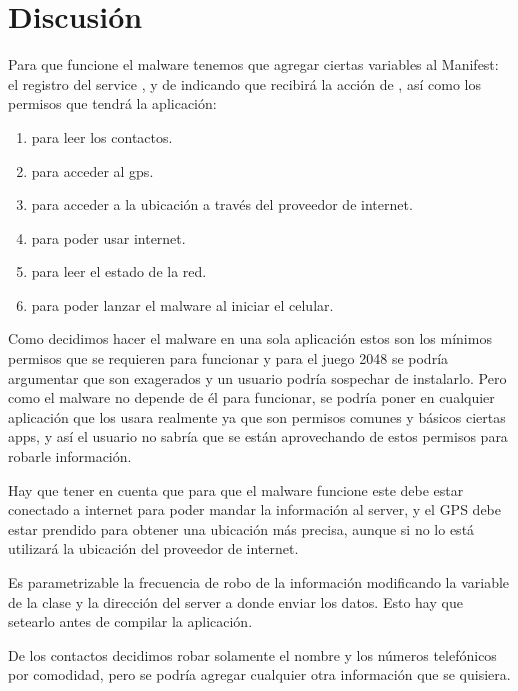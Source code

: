 \section{Discusi\'on}

Para que funcione el malware tenemos que agregar ciertas variables al Manifest: el registro del service , y de  indicando que recibir\'a la acci\'on de , as\'i como los permisos que tendr\'a la aplicaci\'on: 

\begin{enumerate}[nolistsep]
 \item {} para leer los contactos.
 \item {} para acceder al gps.
 \item {} para acceder a la ubicaci\'on a trav\'es del proveedor de internet.
 \item {} para poder usar internet.
 \item {} para leer el estado de la red.
 \item {} para poder lanzar el malware al iniciar el celular. 
\end{enumerate}

Como decidimos hacer el malware en una sola aplicaci\'on estos son los m\'inimos permisos que se requieren para funcionar y para el juego 2048 se podr\'ia argumentar que son exagerados y un usuario podr\'ia sospechar de instalarlo. Pero como el malware no depende de \'el para funcionar, se podr\'ia poner en cualquier aplicaci\'on que los usara realmente ya que son permisos comunes y b\'asicos ciertas apps, y as\'i el usuario no sabr\'ia que se est\'an aprovechando de estos permisos para robarle informaci\'on. 

Hay que tener en cuenta que para que el malware funcione este debe estar conectado a internet para poder mandar la informaci\'on al server, y el GPS debe estar prendido para obtener una ubicaci\'on m\'as precisa, aunque si no lo est\'a utilizar\'a la ubicaci\'on del proveedor de internet. 

Es parametrizable la frecuencia de robo de la informaci\'on modificando la variable  de la clase  y la direcci\'on del server a donde enviar los datos. Esto hay que setearlo antes de compilar la aplicaci\'on. 

De los contactos decidimos robar solamente el nombre y los n\'umeros telef\'onicos por comodidad, pero se podr\'ia agregar cualquier otra informaci\'on que se quisiera. 

